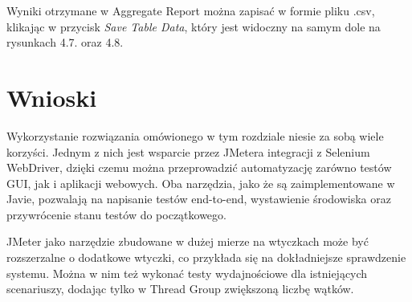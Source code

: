Wyniki otrzymane w Aggregate Report można zapisać w formie pliku .csv, klikając w przycisk \textit{Save Table Data}, który jest widoczny na samym dole na rysunkach 4.7. oraz 4.8.


\section{Wnioski}
Wykorzystanie rozwiązania omówionego w tym rozdziale niesie za sobą wiele korzyści. Jednym z nich jest wsparcie przez JMetera integracji z Selenium WebDriver, dzięki czemu można przeprowadzić automatyzację zarówno testów GUI, jak i aplikacji webowych. Oba narzędzia, jako że są zaimplementowane w Javie, pozwalają na napisanie testów end-to-end, wystawienie środowiska oraz przywrócenie stanu testów do początkowego.


JMeter jako narzędzie zbudowane w dużej mierze na wtyczkach może być rozszerzalne o dodatkowe wtyczki, co przykłada się na dokładniejsze sprawdzenie systemu. Można w nim też wykonać testy wydajnościowe dla istniejących scenariuszy, dodając tylko w Thread Group zwiększoną liczbę wątków.



